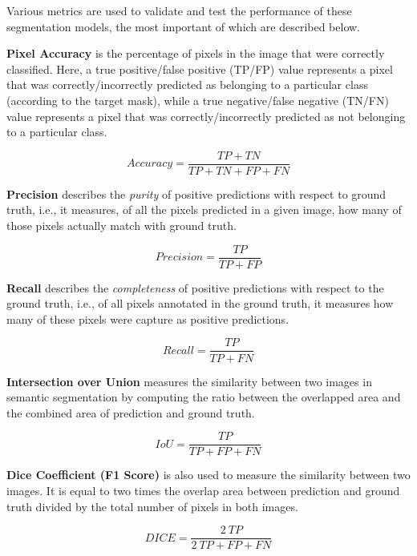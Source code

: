 Various metrics are used to validate and test the performance of these segmentation models, the most important of which are described below.

\textbf{Pixel Accuracy} is the percentage of pixels in the image that were correctly classified. Here, a true positive/false positive (TP/FP) value represents a pixel that was correctly/incorrectly predicted as belonging to a particular class (according to the target mask), while a true negative/false negative (TN/FN) value represents a pixel that was correctly/incorrectly predicted as not belonging to a particular class.

\begin{equation}
    Accuracy = \frac{TP+TN}{TP+TN+FP+FN}
\end{equation}

\textbf{Precision} describes the \textit{purity} of positive predictions with respect to ground truth, i.e., it measures, of all the pixels predicted in a given image, how many of those pixels actually match with ground truth.

\begin{equation}
    Precision = \frac{TP}{TP+FP}
\end{equation}

\textbf{Recall} describes the \textit{completeness} of positive predictions with respect to the ground truth, i.e., of all pixels annotated in the ground truth, it measures how many of these pixels were capture as positive predictions.

\begin{equation}
    Recall = \frac{TP}{TP+FN}
\end{equation}

\textbf{Intersection over Union} measures the similarity between two images in semantic segmentation by computing the ratio between the overlapped area and the combined area of prediction and ground truth.

\begin{equation}
    IoU = \frac{TP}{TP+FP+FN}
\end{equation}

\textbf{Dice Coefficient (F1 Score)} is also used to measure the similarity between two images. It is equal to two times the overlap area between prediction and ground truth divided by the total number of pixels in both images.

\begin{equation}
    DICE = \frac{2 \ TP}{2 \ TP+FP+FN}
\end{equation}

